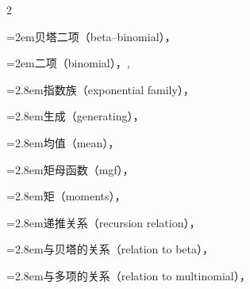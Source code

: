 \begin{multicols}{2}
\par\noindent\hangindent=2em\hspace*{1em}\label{idx:260}贝塔二项（beta–binomial），\hyperref[exercise:4.34]{\pageref*{exercise:4.34}}\par
\par\noindent\hangindent=2em\hspace*{1em}\label{idx:261}二项（binomial），\hyperref[ex:2.1.1]{\pageref*{ex:2.1.1}}, \hyperref[idxocc:261:104]{\pageref*{idxocc:261:104}}\par
\par\noindent\hangindent=2.8em\hspace*{1.8em}\label{idx:262}指数族（exponential family），\hyperref[ex:3.4.1]{\pageref*{ex:3.4.1}}\par
\par\noindent\hangindent=2.8em\hspace*{1.8em}\label{idx:263}生成（generating），\hyperref[ex:5.6.5]{\pageref*{ex:5.6.5}}\par
\par\noindent\hangindent=2.8em\hspace*{1.8em}\label{idx:264}均值（mean），\hyperref[ex:2.2.3]{\pageref*{ex:2.2.3}}\par
\par\noindent\hangindent=2.8em\hspace*{1.8em}\label{idx:265}矩母函数（mgf），\hyperref[ex:2.3.9]{\pageref*{ex:2.3.9}}\par
\par\noindent\hangindent=2.8em\hspace*{1.8em}\label{idx:266}矩（moments），\hyperref[ex:3.4.3]{\pageref*{ex:3.4.3}}\par
\par\noindent\hangindent=2.8em\hspace*{1.8em}\label{idx:267}递推关系（recursion relation），\hyperref[eq:3.2.7]{\pageref*{eq:3.2.7}}\par
\par\noindent\hangindent=2.8em\hspace*{1.8em}\label{idx:268}与贝塔的关系（relation to beta），\hyperref[exercise:2.40]{\pageref*{exercise:2.40}}\par
\par\noindent\hangindent=2.8em\hspace*{1.8em}\label{idx:269}与多项的关系（relation to multinomial），\hyperref[idxocc:269:179]{\pageref*{idxocc:269:179}}\par

\end{multicols}

